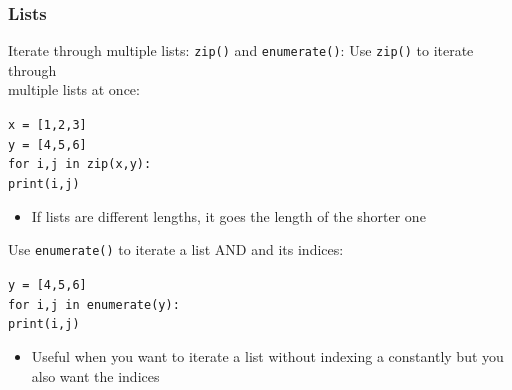 \documentclass{beamer}
\newcommand{\code}[1]{\texttt{#1}}
\newcommand{\tab}{\hspace*{22pt}}
\begin{document}
\begin{frame}%
	\frametitle{Lists}
	
	\begin{block}{Iterate through multiple lists: \code{zip()} and \code{enumerate()}:}
			Use \code{zip()} to iterate through \\ multiple lists at once:
			
			\vspace{10pt}
			\code{x = [1,2,3] \\
			y = [4,5,6] \\
			for i,j in zip(x,y): \\
			\tab print(i,j)
			}
			
			\vspace{10pt}
			\begin{itemize}
				\item If lists are different lengths, it goes the length of the shorter one
			\end{itemize}
		\endminipage\hfill
			Use \code{enumerate()} to iterate a list AND and its indices:
			
			\vspace{10pt}
			\code{y = [4,5,6] \\
			for i,j in enumerate(y): \\
			\tab print(i,j)
			}
			
			\vspace{10pt}
			\begin{itemize}
				\item Useful when you want to iterate a list without indexing a constantly but you also want the indices
			\end{itemize}
		\endminipage\hfill
	\end{block}
	
\end{frame}
\end{document}
